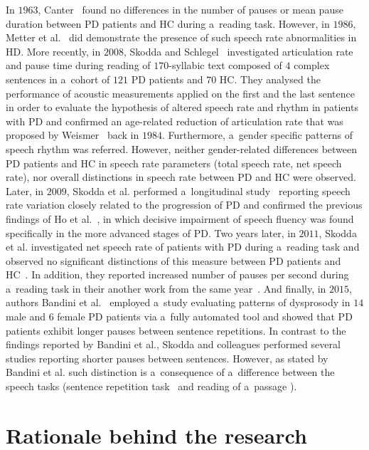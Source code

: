 In $1963$, Canter~\cite{Canter1965} found no differences in the number of pauses or mean pause duration between PD patients and HC during a~reading task. However, in $1986$, Metter et al.~\cite{Metter1986} did demonstrate the presence of such speech rate abnormalities in HD. More recently, in $2008$, Skodda and Schlegel~\cite{Skodda2008} investigated articulation rate and pause time during reading of $170$-syllabic text composed of $4$ complex sentences in a~cohort of $121$ PD patients and $70$ HC. They analysed the performance of acoustic measurements applied on the first and the last sentence in order to evaluate the hypothesis of altered speech rate and rhythm in patients with PD and confirmed an age-related reduction of articulation rate that was proposed by Weismer~\cite{Weismer1984} back in $1984$. Furthermore, a~gender specific patterns of speech rhythm was referred. However, neither gender-related differences between PD patients and HC in speech rate parameters (total speech rate, net speech rate), nor overall distinctions in speech rate between PD and HC were observed. Later, in $2009$, Skodda et al. performed a~longitudinal study~\cite{Skodda2009} reporting speech rate variation closely related to the progression of PD and confirmed the previous findings of Ho et al.~\cite{Ho1999a}, in which decisive impairment of speech fluency was found specifically in the more advanced stages of PD. Two years later, in $2011$, Skodda et al. investigated net speech rate of patients with PD during a~reading task and observed no significant distinctions of this measure between PD patients and HC~\cite{Skodda2011b}. In addition, they reported increased number of pauses per second during a~reading task in their another work from the same year~\cite{Skodda2011c}. And finally, in $2015$, authors Bandini et al.~\cite{Bandini2015} employed a~study evaluating patterns of dysprosody in $14$ male and $6$ female PD patients via a~fully automated tool and showed that PD patients exhibit longer pauses between sentence repetitions. In contrast to the findings reported by Bandini et al., Skodda and colleagues performed several studies \cite{Skodda2010, Skodda2011c} reporting shorter pauses between sentences. However, as stated by Bandini et al. such distinction is a~consequence of a~difference between the speech tasks (sentence repetition task~\cite{Bandini2015} and reading of a~passage \cite{Skodda2010, Skodda2011c}).

\section{Rationale behind the research}
\label{ch4_2}

